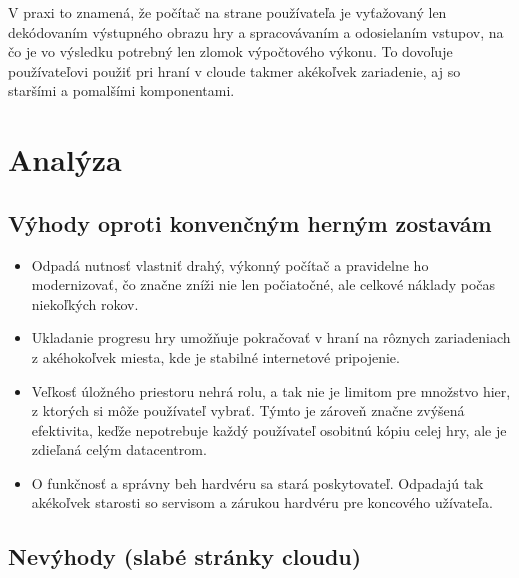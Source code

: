 \documentclass[10pt,twoside,slovak,a4paper]{article}
\begin{document}
V praxi to znamená, že počítač na strane používateľa je vyťažovaný len dekódovaním výstupného obrazu hry a spracovávaním a odosielaním vstupov, na čo je vo výsledku potrebný len zlomok výpočtového výkonu. To dovoľuje používateľovi použiť pri hraní v cloude takmer akékoľvek zariadenie, aj so staršími a pomalšími komponentami.\cite{7182690}



\section {Analýza}



\subsection{Výhody oproti konvenčným herným zostavám\cite{10.1007/978-981-10-6620-7_71}}

\begin{itemize}

\item Odpadá nutnosť vlastniť drahý, výkonný počítač a pravidelne ho modernizovať, čo značne zníži nie len počiatočné, ale celkové náklady počas niekoľkých rokov.

\item Ukladanie progresu hry umožňuje pokračovať v hraní na rôznych zariadeniach z akéhokoľvek miesta, kde je stabilné internetové pripojenie.

\item Veľkosť úložného priestoru nehrá rolu, a tak nie je limitom pre množstvo hier, z ktorých si môže používateľ vybrať. Týmto je zároveň značne zvýšená efektivita, keďže nepotrebuje každý používateľ osobitnú kópiu celej hry, ale je zdieľaná celým datacentrom.

\item O funkčnosť a správny beh hardvéru sa stará poskytovateľ. Odpadajú tak akékoľvek starosti so servisom a zárukou hardvéru pre koncového užívateľa.

\end{itemize}



\subsection{Nevýhody (slabé stránky cloudu)\cite{10.1007/978-981-10-6620-7_71}}
\end{document}
